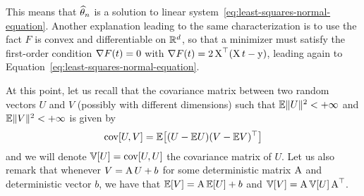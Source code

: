 This means that $\widehat \theta_n$ is a solution to linear system~\eqref{eq:least-squares-normal-equation}.%
Another explanation leading to the same characterization is to use the fact $F$ is convex%
   and differentiable on $\mathbb R^d$, so that a minimizer must satisfy the first-order condition $\nabla F(t) = 0$ with $\nabla F(t) =  2 \operatorname{{\boldsymbol X}}^\top (\operatorname{{\boldsymbol X}} t - \operatorname{{\boldsymbol y}})$, leading again to Equation~\eqref{eq:least-squares-normal-equation}.

At this point, let us recall that the covariance matrix between two random vectors $U$ and $V$ (possibly with different dimensions) such that $\mathbb E \| U \|^2 < +\infty$ and $\mathbb E \| V \|^2 < +\infty$ is given by
\begin{equation*}
	\operatorname{cov}[U, V] = \mathbb E \big[ (U - \mathbb E U)(V - \mathbb E V)^\top \big]
\end{equation*}
and we will denote $\mathbb V[U] = \operatorname{cov}[U, U]$ the covariance matrix of $U$.
Let us also remark that whenever $V = \operatorname{{\boldsymbol A}} U + b$ for some deterministic matrix $\operatorname{{\boldsymbol A}}$ and deterministic vector $b$, we have that $\mathbb E [V] = \operatorname{{\boldsymbol A}} \mathbb E [U] + b$ and $\mathbb V[V] = \operatorname{{\boldsymbol A}} \mathbb V[U] \operatorname{{\boldsymbol A}}^\top$.

